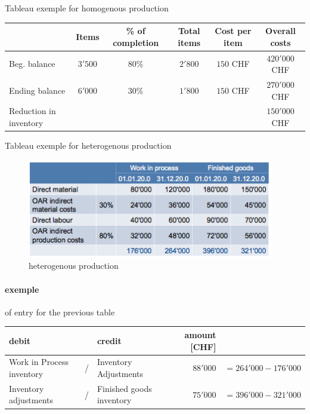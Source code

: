 \documentclass[a4paper] {scrartcl}
\begin{document}
Tableau exemple for homogenous production
\\

\begin{tabular}{| l|c|c|c|c|c|}
	\hline
	 & Items & \% of completion & Total items & Cost per item & Overall costs\\
	\hline
	Beg. balance & $3'500$ & $80\%$ & $2'800$ & $150$ CHF & $420'000$ CHF\\
	\hline
	Ending balance & $6'000$ & $30\%$ & $1'800$ &$150$ CHF & $270'000$ CHF\\
	\hline\hline
	Reduction in inventory & & & & & $150'000$ CHF\\
	\hline
\end{tabular}



Tableau exemple for heterogenous production
\\
\begin{figure}[htbp]
	\centering
		\includegraphics[height=1.7in]{images/heteroProd.png}
	\caption{heterogenous production}
	\label{fig:images_heteroProd}
\end{figure}

\paragraph{exemple} of entry for the previous table %
\label{par:exemple}

\begin{tabular}{lllrl}
	\textbf{debit} & & \textbf{credit} & \textbf{amount} [CHF]&\\
	\hline
	 Work in Process inventory & / &  Inventory Adjustments & $88'000$&$=264'000-176'000$\\
	 Inventory adjustments & / &  Finished goods inventory & $75'000$&$=396'000-321'000$\\
\end{tabular}




\end{document}

